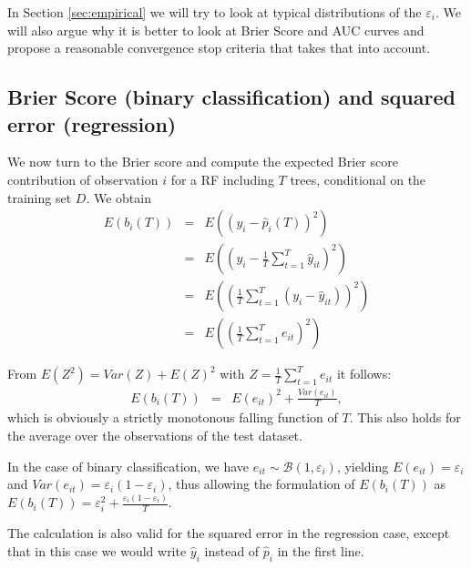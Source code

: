 \documentclass[paper=a4
               ,12pt
               ,DIV=12
               ,parskip=half
               ,titlepage=on
               ,headinclude 
               ,footinclude
               ,headsepline
               ,footsepline         %
               ,ilines 
               ]{scrartcl}
\begin{document}
In Section \ref{sec:empirical} we will try to look at typical distributions of the $\varepsilon_i$. We will also argue why it is better to look at Brier Score and AUC curves 
and propose a reasonable convergence stop criteria that takes that into account.




\subsection{Brier Score (binary classification) and squared error (regression)}
We now turn to the Brier score and compute the expected Brier score contribution of observation $i$ for a RF including $T$ trees, conditional on the training set $D$. We obtain
\begin{eqnarray*}
 E(b_i(T)) & = & E((y_i - \hat{p}_i(T) ) ^2) \\
                    & = & E \left( \left( y_i-\frac{1}{T}\sum_{t=1}^T\hat{y}_{it} \right)^2 \right) \\
                    & = & E \left( \left( \frac{1}{T}\sum_{t=1}^T(y_i-\hat{y}_{it}) \right)^2 \right) \\
                    & = & E \left( \left( \frac{1}{T}\sum_{t=1}^T e_{it} \right)^2 \right)
\end{eqnarray*} 


From $E(Z^2) = Var(Z)+E(Z)^2$ with $Z=\frac{1}{T}\sum_{t=1}^T e_{it}$  it follows:
\begin{eqnarray*}
 E(b_i(T)) & = & E(e_{it})^2+\frac{Var(e_{it})}{T},
\end{eqnarray*} 
which is obviously a strictly monotonous falling function of $T$. This also holds for the average over the observations of the test dataset. 

In the case of binary classification, we have  $e_{it}\sim\mathcal{B}(1,\varepsilon_i)$, yielding $E(e_{it})=\varepsilon_i$ and $Var(e_{it})=\varepsilon_i(1-\varepsilon_i)$, thus allowing the formulation of  $E(b_i(T))$ as $E(b_i(T))=\varepsilon_i^2+\frac{\varepsilon_i(1-\varepsilon_i)}{T}$.

The calculation is also valid for the squared error in the regression case, except that in this case we would write $\hat{y}_{i}$ instead of $\hat{p}_{i}$ in the first line. 
\end{document}
